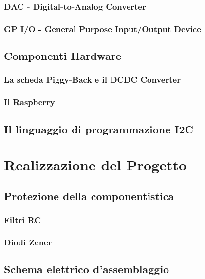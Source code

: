 \documentclass[10pt]{article}
\begin{document}
		\subsubsection{DAC - Digital-to-Analog Converter}\label{sec:dac}
	
		\subsubsection{GP I/O - General Purpose Input/Output Device}\label{sec:gpio}
	
	\subsection{Componenti Hardware}
		\subsubsection{La scheda Piggy-Back e il DCDC Converter}\label{sec:piggy}
		
		\subsubsection{Il Raspberry}\label{sec:rasp}
		
	\subsection{Il linguaggio di programmazione I2C}\label{sec:i2c}

\section{Realizzazione del Progetto}

	\subsection{Protezione della componentistica}
		\subsubsection{Filtri RC}
		
		\subsubsection{Diodi Zener}
	
	\subsection{Schema elettrico d'assemblaggio}
\end{document}
